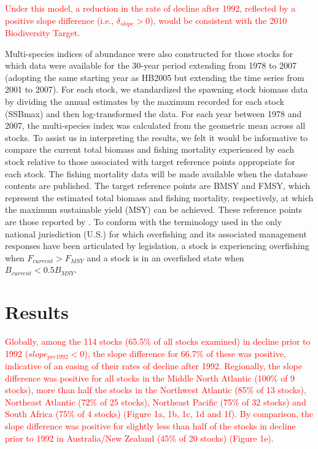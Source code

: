 \documentclass[letterpaper,12pt]{article}
\begin{document}
\textcolor{red}{
Under this model, a reduction in the rate of decline after 1992, reflected by a positive
slope difference (i.e., $\delta_{slope} > 0$),
would be consistent with the 2010 Biodiversity Target.
}

Multi-species indices of abundance were also constructed for those
stocks for which data were available for the 30-year period extending
from 1978 to 2007 (adopting the same starting year as HB2005 but
extending the time series from 2001 to 2007). For each stock, we
standardized the spawning stock biomass data by dividing the annual
estimates by the maximum recorded for each stock (SSBmax) and then
log-transformed the data. For each year between 1978 and 2007, the
multi-species index was calculated from the geometric mean across all
stocks.  To assist us in interpreting the results, we felt it would be
informative to compare the current total biomass and fishing mortality
experienced by each stock relative to those associated with target
reference points appropriate for each stock. The fishing mortality
data will be made available when the database contents are published. The
target reference points are BMSY and FMSY, which represent the
estimated total biomass and fishing mortality, respectively, at which
the maximum sustainable yield (MSY) can be achieved. These reference
points are those reported by \citet{Worm:etal:2009:science}. To conform with the
terminology used in the only national jurisdiction (U.S.) for which
overfishing and its associated management responses have been
articulated by legislation, a stock is experiencing overfishing when
 $F_{current} > F_{MSY}$  and a stock is in an overfished state when  $B_{current} < 0.5B_{MSY}$.

\section{Results} 
\textcolor{red}{
Globally, among the 114 stocks (65.5\% of all stocks examined) in
decline prior to 1992 ($slope_{pre1992} < 0$), the slope difference
for 66.7\% of these was positive, indicative of an easing of their
rates of decline after 1992. Regionally, the slope difference was
positive for all stocks in the Middle North Atlantic (100\% of 9
stocks), more than half the stocks in the Northwest Atlantic (85\% of
13 stocks), Northeast Atlantic (72\% of 25 stocks), Northeast Pacific
(75\% of 32 stocks) and South Africa (75\% of 4 stocks) (Figure 1a,
1b, 1c, 1d and 1f). By comparison, the slope difference was positive for
slightly less than half of the stocks in decline prior to 1992 in
Australia/New Zealand (45\% of 20 stocks) (Figure 1e).
}
\end{document}
